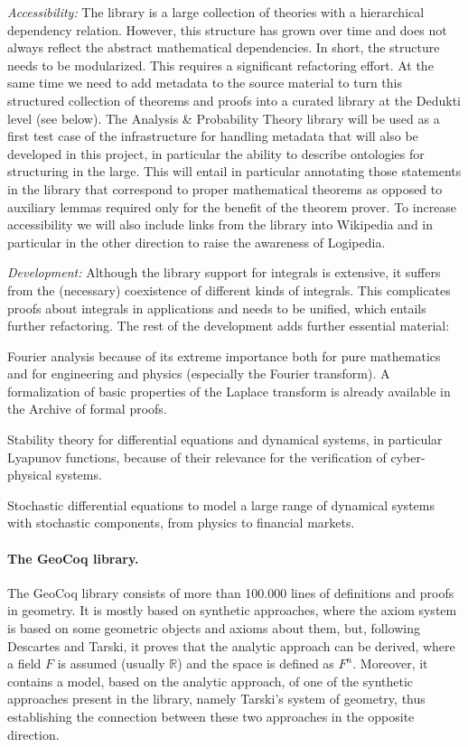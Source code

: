 \emph{Accessibility:}
The library is a large collection of theories with a hierarchical dependency
relation. However, this structure has grown over time and does not always
reflect the abstract mathematical dependencies. In short, the structure needs
to be modularized. This requires a significant refactoring effort.
%
At the same time we need to add metadata to the source material to turn this
structured collection of theorems and proofs into a curated library at the
Dedukti level (see below). The Analysis \& Probability Theory library will be
used as a first test case of the infrastructure
for handling metadata that will also be developed in this project, in
particular the ability to describe ontologies for structuring in the large.
This will entail in particular annotating those statements in the library that
correspond to proper mathematical theorems as opposed to auxiliary lemmas
required only for the benefit of the theorem prover.
To increase accessibility we will also include links from the library into
Wikipedia and in particular in the other direction to raise the awareness
of Logipedia.

\emph{Development:}
Although the library support for integrals is extensive, it suffers
from the (necessary) coexistence of different kinds of
integrals. This complicates proofs about integrals in applications and needs
to be unified, which entails further refactoring. The rest of the
development adds further essential material:
\begin{compactitem}
\item Fourier analysis because of its extreme importance both for pure mathematics and for
engineering and physics (especially the Fourier
transform). A formalization of basic properties of the Laplace transform is already available in the Archive of formal proofs.
\item Stability theory for differential equations and
dynamical systems, in particular Lyapunov functions, because of their
relevance for the verification of cyber-physical systems.
\item Stochastic differential equations to model a large range of
dynamical systems with stochastic components, from physics to financial markets.
\end{compactitem}

\paragraph*{The GeoCoq library.}
The GeoCoq library consists of more than 100.000 lines of definitions
and proofs in geometry. It is mostly based on synthetic approaches,
where the axiom system is based on some geometric objects and axioms
about them, but, following Descartes and Tarski, it proves that the
analytic approach can be derived, where a field $F$ is assumed
(usually $\mathbb{R}$) and the space is defined as $F^n$. Moreover, it
contains a model, based on the analytic approach, of one of the
synthetic approaches present in the library, namely Tarski's system of
geometry, thus establishing the connection between these two
approaches in the opposite direction.

